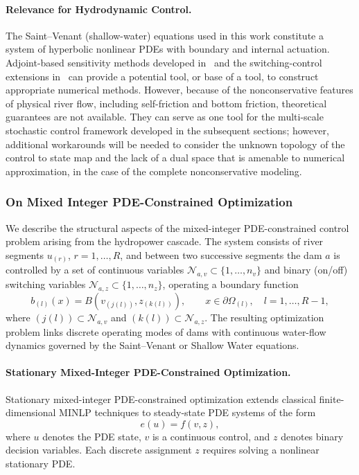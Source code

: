 \documentclass{article}
\newcommand{\1}{\mathds{1}}          %
\theoremstyle{definition}
\begin{document}
\begin{sloppypar}
\paragraph{Relevance for Hydrodynamic Control.} The Saint--Venant (shallow-water) equations used in this work constitute a system of hyperbolic
nonlinear PDEs with boundary and internal actuation.  Adjoint-based sensitivity methods developed in~\cite{Sulb2016,ulbrichpdeopthyper} and the switching-control extensions in~\cite{PfaffUlbrichTLP} can provide a potential tool, or base of a tool, to construct appropriate numerical methods. However, because of the nonconservative features of physical river flow, including self-friction and bottom friction, theoretical guarantees are not available. They can serve as one tool for the multi-scale stochastic control framework developed in the
subsequent sections; however, additional workarounds will be needed to consider the unknown topology of the control to state map and the lack of a dual space that is amenable to numerical approximation, in the case of the complete nonconservative modeling.

\subsubsection{On Mixed Integer PDE-Constrained Optimization}



We describe the structural aspects of the mixed-integer PDE-constrained control problem
arising from the hydropower cascade. The system consists of river segments
$u_{(r)}$, $r=1,\ldots,R$, and between two successive segments the dam $a$
is controlled by a set of continuous variables $\mathcal{N}_{a,v}\subset\{1,\dots,n_v\}$ 
and binary (on/off) switching variables $\mathcal{N}_{a,z}\subset\{1,\dots,n_z\}$, 
operating a boundary function 
\[
b_{(l)}(x)=B(v_{(j(l))},z_{(k(l))}), 
\qquad 
x\in\partial\Omega_{(l)},\quad l=1,\ldots,R-1,
\]
where $(j(l))\subset\mathcal{N}_{a,v}$ and $(k(l))\subset\mathcal{N}_{a,z}$.
The resulting optimization problem links discrete operating modes of dams with continuous
water-flow dynamics governed by the Saint--Venant or Shallow Water equations.

\paragraph{Stationary Mixed-Integer PDE-Constrained Optimization.}
Stationary mixed-integer PDE-constrained optimization extends classical finite-dimensional
MINLP techniques to steady-state PDE systems of the form
\[
e(u)=f(v,z),
\]
where $u$ denotes the PDE state, $v$ is a continuous control, and $z$ denotes binary
decision variables. Each discrete assignment $z$ requires solving a nonlinear stationary PDE.


\end{sloppypar}
\end{document}
